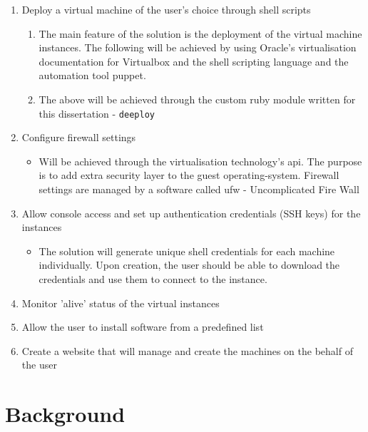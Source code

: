 \documentclass{article}
\begin{document}
\begin{enumerate}
    \item Deploy a virtual machine of the user's choice through shell scripts
          \begin{enumerate}
              \item The main feature of the solution is the deployment of the virtual machine instances. The following will be achieved by using Oracle's virtualisation documentation for Virtualbox and the shell scripting language and the automation tool \gls{puppet}.
              \item The above will be achieved through the custom ruby module written for this dissertation - \texttt{deeploy}
          \end{enumerate}

    \item Configure firewall settings
          \begin{itemize}
              \item Will be achieved through the virtualisation technology's \gls{api}. The purpose is to add extra security layer to the guest \gls{operating-system}. Firewall settings are managed by a software called ufw - Uncomplicated Fire Wall
          \end{itemize}

    \item Allow console access and set up authentication credentials (SSH keys) for the instances
          \begin{itemize}
              \item The solution will generate unique shell credentials for each machine individually. Upon creation, the user should be able to download the credentials and use them to connect to the instance.
          \end{itemize}
    \item Monitor 'alive' status of the virtual instances
    \item Allow the user to install software from a predefined list
    \item Create a website that will manage and create the machines on the behalf of the user
\end{enumerate}

\newpage
\section{Background}
\end{document}
